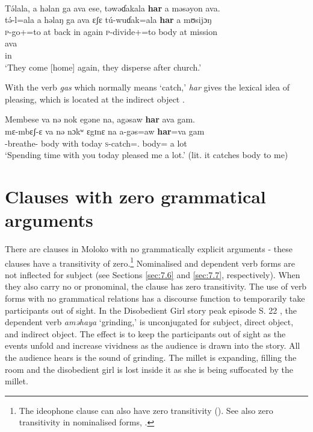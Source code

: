 \ea \label{ex:9:65}
\\
T\'{ə}lala,  a  həlan  ga  ava  ese,  təwəɗakala  \textbf{har}  a  məsəyon  ava.\\
\gll  t\'{ə}-l=ala        a   həlaŋ  ga   ava   ɛʃɛ   t\'{u}-wuɗak=ala   \textbf{har}   a   mʊsijɔŋ\\   
      \textsc{p}-go+{\IFV}=to    at  back  {\ADJ}  in  again  \textsc{p}-divide+{\IFV}=to     body  at  mission\\ 

\medskip
ava\\
in\\
\glt  ‘They come [home] again, they disperse after church.’
\z

With the verb \textit{gas} which normally means ‘catch,’ \textit{har}  gives the lexical idea of pleasing, which is located at the indirect object .

\ea \label{ex:9:66}
Membese  va  nə  nok  egəne  na,  agəsaw  \textbf{har}  ava  gam.\\
\gll  mɛ-mbɛʃ-ɛ     va  nə  nɔkʷ  ɛgɪnɛ  na  a-gəs=aw  \textbf{har}=va  gam\\
      {\NOM}{}-breathe-{\CL}  body  with  {\twoS}  today  {\PSP}  \textsc{s}-catch={\oneS}.{\IO}  body{=\PRF}  {a lot}\\
\glt  ‘Spending time with you today pleased me a lot.’ (lit. it catches body to me) 
\z
{}
\largerpage
\section{Clauses with zero grammatical arguments}\label{sec:9.4}
\hypertarget{RefHeading1212781525720847}{}
There are clauses in Moloko with no grammatically explicit arguments - these clauses have a transitivity of zero.\footnote{The ideophone clause can also have zero transitivity %
(). See also zero transitivity in nominalised forms, .} Nominalised and dependent verb forms are not inflected for subject (see Sections \ref{sec:7.6} and \ref{sec:7.7}, respectively). When they also carry no \DO or \IO pronominal, the clause has zero transitivity. The use of verb forms with no grammatical relations has a discourse function to temporarily take participants out of sight. In the Disobedient Girl story peak episode S. 22 , the dependent verb \textit{aməhaya} ‘grinding,’ is unconjugated for subject, direct object, and indirect object. The effect is to keep the participants out of sight as the events unfold and increase vividness as the audience is drawn into the story. All the audience hears is the sound of grinding. The millet is expanding, filling the room and the disobedient girl is lost inside it as she is being suffocated by the millet.  

